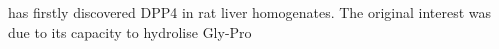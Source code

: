 \citet{Hopsu-Havu1966} has firstly discovered DPP4 in rat liver homogenates. The original interest was due to its capacity to hydrolise Gly-Pro